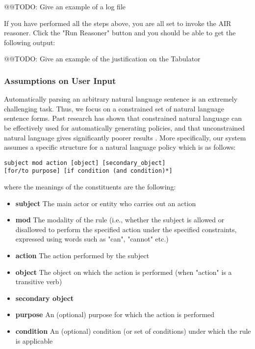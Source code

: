 \documentclass{llncs}
\begin{document}
@@TODO: Give an example of a log file

If you have performed all the steps above, you are all set to invoke the AIR reasoner. Click the "Run Reasoner" button and you should be able to get the following output:

@@TODO: Give an example of the justification on the Tabulator

\subsubsection{Assumptions on User Input}

Automatically parsing an arbitrary natural language sentence is an extremely challenging task. Thus, we focus on a constrained set of natural language sentence forms. Past research has shown that constrained natural language can be effectively used for automatically generating policies, and that unconstrained natural language gives significantly poorer results \cite{karat,sparcle}. More specifically, our system assumes a specific structure for a natural language policy which is as follows:

\begin{verbatim}
subject mod action [object] [secondary_object] 
[for/to purpose] [if condition (and condition)*]
\end{verbatim}

where the meanings of the constituents are the following:

\begin{itemize}
\item \textbf{subject} The main actor or entity who carries out an action
\item \textbf{mod} The modality of the rule (i.e., whether the subject is allowed or disallowed to perform the specified action under the specified constraints, expressed using words such as "can", "cannot" etc.)
\item \textbf{action} The action performed by the subject
\item \textbf{object} The object on which the action is performed (when "action" is a transitive verb)
\item \textbf{secondary object} 
\item \textbf{purpose} An (optional) purpose for which the action is performed
\item \textbf{condition} An (optional) condition (or set of conditions) under which the rule is applicable
\end{itemize}
\end{document}
